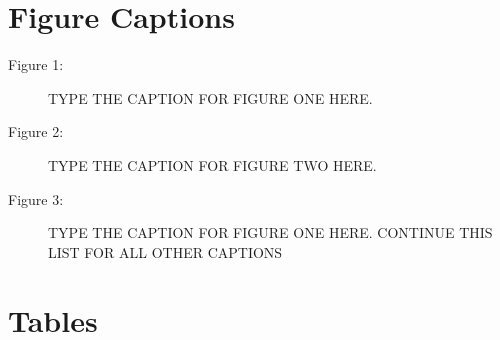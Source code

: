 \documentclass[preprint,5p,authoryear]{elsarticle}
\begin{document}


\pagebreak

\section*{Figure Captions}

\begin{description}
\item[Figure 1:]  TYPE THE CAPTION FOR FIGURE ONE HERE.
\item[Figure 2:]  TYPE THE CAPTION FOR FIGURE TWO HERE.
\item[Figure 3:]  TYPE THE CAPTION FOR FIGURE ONE HERE.  CONTINUE THIS LIST FOR ALL OTHER CAPTIONS
\end{description}





\pagebreak

\section*{Tables}
\end{document}
